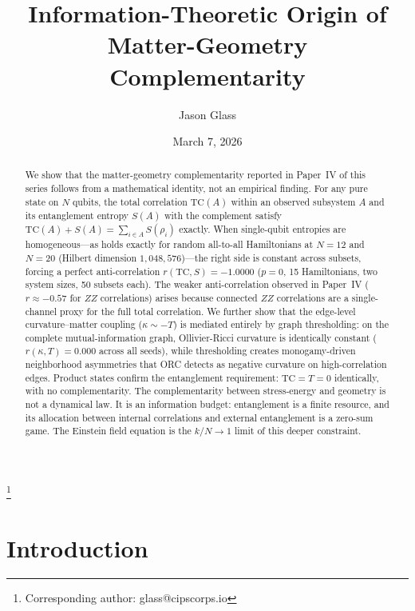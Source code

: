 \documentclass[aps,pra,twocolumn,superscriptaddress,floatfix]{revtex4-2}
\begin{document}
\title{Information-Theoretic Origin of Matter-Geometry Complementarity}

\author{Jason Glass}
\thanks{Corresponding author: glass@cipscorps.io}

\date{March 7, 2026}

\begin{abstract}
We show that the matter-geometry complementarity
reported in Paper~IV of this series follows from a mathematical identity,
not an empirical finding.
For any pure state on $N$ qubits, the total correlation $\mathrm{TC}(A)$
within an observed subsystem $A$ and its entanglement entropy
$S(A)$ with the complement satisfy
$\mathrm{TC}(A) + S(A) = \sum_{i \in A} S(\rho_i)$ exactly.
When single-qubit entropies are homogeneous---as holds exactly
for random all-to-all Hamiltonians at $N = 12$ and $N = 20$
(Hilbert dimension $1{,}048{,}576$)---the right side
is constant across subsets, forcing a perfect anti-correlation
$r(\mathrm{TC}, S) = -1.0000$ ($p = 0$, 15 Hamiltonians,
two system sizes, 50 subsets each).
The weaker anti-correlation observed in Paper~IV
($r \approx -0.57$ for $ZZ$ correlations) arises because
connected $ZZ$ correlations are a single-channel proxy
for the full total correlation.
We further show that the edge-level curvature--matter coupling
($\kappa \sim -T$) is mediated entirely by graph thresholding:
on the complete mutual-information graph, Ollivier-Ricci
curvature is identically constant ($r(\kappa, T) = 0.000$
across all seeds), while thresholding creates
monogamy-driven neighborhood asymmetries that ORC detects
as negative curvature on high-correlation edges.
Product states confirm the entanglement requirement:
$\mathrm{TC} = T = 0$ identically, with no complementarity.
The complementarity between stress-energy and geometry
is not a dynamical law.  It is an information budget:
entanglement is a finite resource, and its allocation
between internal correlations and external entanglement
is a zero-sum game.  The Einstein field equation is
the $k/N \to 1$ limit of this deeper constraint.
\end{abstract}

\maketitle

\section{Introduction}
\end{document}
